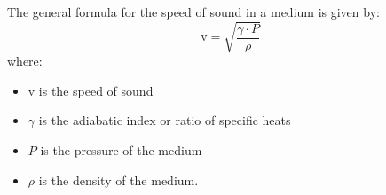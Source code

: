 \documentclass[journal,12pt,twocolumn]{IEEEtran}
\theoremstyle{remark}
\begin{document}
The general formula for the speed of sound in a medium is given by:
$$\text{v}=\sqrt{ \frac{\gamma \cdot P}{\rho}}$$
where:
\begin{itemize}
    \item v is the speed of sound
    \item $\gamma$ is the adiabatic index or ratio of specific heats
    \item $P$ is the pressure of the medium
    \item $\rho$ is the density of the medium.
\end{itemize}







        
        
        
             
             
        

        













\renewcommand{\thefigure}{\theenumi}
\renewcommand{\thetable}{\theenumi}
\end{document}
